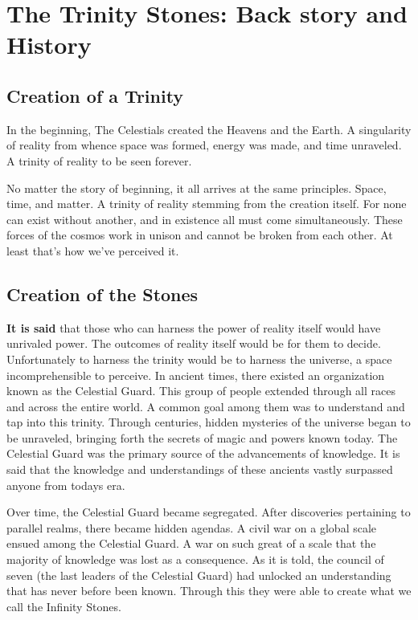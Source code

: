 \chapter{The Trinity Stones: Back story and History}

\section{Creation of a Trinity}

\begin{quotebox}
	In the beginning, The Celestials created the Heavens and the Earth. A singularity of reality from whence space was formed, energy was made, and time unraveled. A trinity of reality to be seen forever.
\end{quotebox}

No matter the story of beginning, it all arrives at the same principles. Space, time, and matter. A trinity of reality stemming from the creation itself. For none can exist without another, and in existence all must come simultaneously. These forces of the cosmos work in unison and cannot be broken from each other. At least that's how we've perceived it.

\section{Creation of the Stones}

\textbf{It is said} that those who can harness the power of reality itself would have unrivaled power. The outcomes of reality itself would be for them to decide. Unfortunately to harness the trinity would be to harness the universe, a space incomprehensible to perceive. In ancient times, there existed an organization known as the Celestial Guard. This group of people extended through all races and across the entire world. A common goal among them was to understand and tap into this trinity. Through centuries, hidden mysteries of the universe began to be unraveled, bringing forth the secrets of magic and powers known today. The Celestial Guard was the primary source of the advancements of knowledge. It is said that the knowledge and understandings of these ancients vastly surpassed anyone from todays era. 

Over time, the Celestial Guard became segregated. After discoveries pertaining to parallel realms, there became hidden agendas. A civil war on a global scale ensued among the Celestial Guard. A war on such great of a scale that the majority of knowledge was lost as a consequence. As it is told, the council of seven (the last leaders of the Celestial Guard) had unlocked an understanding that has never before been known. Through this they were able to create what we call the Infinity Stones. 

